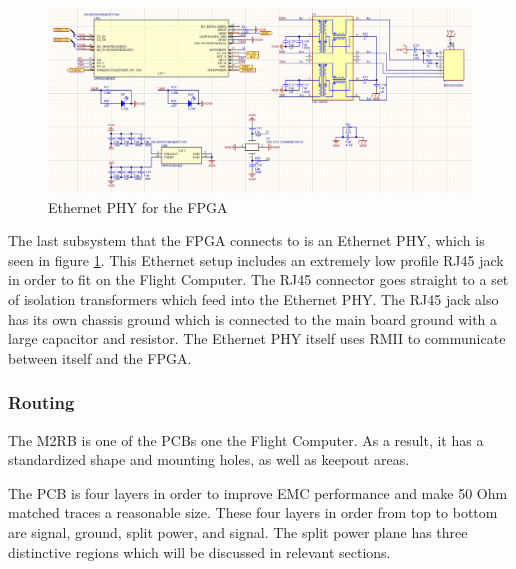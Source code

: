 \documentclass[crop=false]{standalone}
\begin{document}
       \begin{figure}[H]
            \centering
            \includegraphics[width=\textwidth]{FPGAEthernet.PNG}
            \caption{Ethernet PHY for the FPGA}
            \label{fig:FPGAEther}
        \end{figure}
        
        The last subsystem that the FPGA connects to is an Ethernet PHY, which is seen in figure \ref{fig:FPGAEther}. This Ethernet setup includes an extremely low profile RJ45 jack in order to fit on the Flight Computer. The RJ45 connector goes straight to a set of isolation transformers which feed into the Ethernet PHY. The RJ45 jack also has its own chassis ground which is connected to the main board ground with a large capacitor and resistor. The Ethernet PHY itself uses RMII to communicate between itself and the FPGA.
      
    \pagebreak   
    \subsubsection{Routing}
        The M2RB is one of the PCBs one the Flight Computer. As a result, it has a standardized shape and mounting holes, as well as keepout areas.
        
        The PCB is four layers in order to improve EMC performance and make 50 Ohm matched traces a reasonable size. These four layers in order from top to bottom are signal, ground, split power, and signal. The split power plane has three distinctive regions which will be discussed in relevant sections.
        
\end{document}
